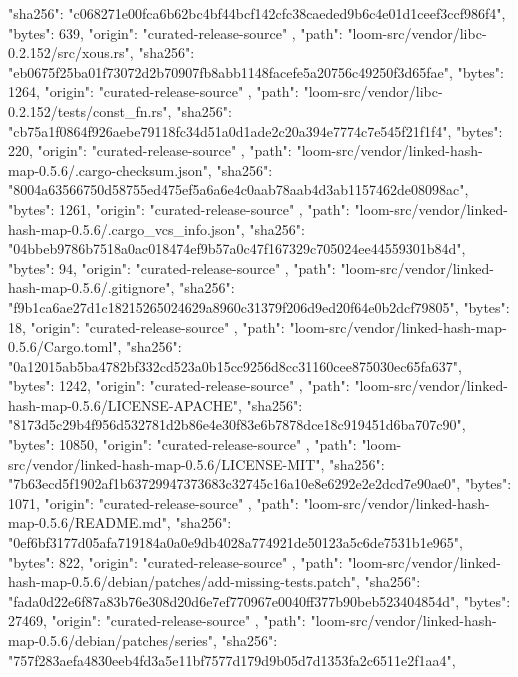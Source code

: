 {{      "sha256": "c068271e00fca6b62bc4bf44bcf142cfc38caeded9b6c4e01d1ceef3ccf986f4",
      "bytes": 639,
      "origin": "curated-release-source"
    },
    {
      "path": "loom-src/vendor/libc-0.2.152/src/xous.rs",
      "sha256": "eb0675f25ba01f73072d2b70907fb8abb1148facefe5a20756c49250f3d65fae",
      "bytes": 1264,
      "origin": "curated-release-source"
    },
    {
      "path": "loom-src/vendor/libc-0.2.152/tests/const_fn.rs",
      "sha256": "cb75a1f0864f926aebe79118fc34d51a0d1ade2c20a394e7774c7e545f21f1f4",
      "bytes": 220,
      "origin": "curated-release-source"
    },
    {
      "path": "loom-src/vendor/linked-hash-map-0.5.6/.cargo-checksum.json",
      "sha256": "8004a63566750d58755ed475ef5a6a6e4c0aab78aab4d3ab1157462de08098ac",
      "bytes": 1261,
      "origin": "curated-release-source"
    },
    {
      "path": "loom-src/vendor/linked-hash-map-0.5.6/.cargo_vcs_info.json",
      "sha256": "04bbeb9786b7518a0ac018474ef9b57a0c47f167329c705024ee44559301b84d",
      "bytes": 94,
      "origin": "curated-release-source"
    },
    {
      "path": "loom-src/vendor/linked-hash-map-0.5.6/.gitignore",
      "sha256": "f9b1ca6ae27d1c18215265024629a8960c31379f206d9ed20f64e0b2dcf79805",
      "bytes": 18,
      "origin": "curated-release-source"
    },
    {
      "path": "loom-src/vendor/linked-hash-map-0.5.6/Cargo.toml",
      "sha256": "0a12015ab5ba4782bf332cd523a0b15cc9256d8cc31160cee875030ec65fa637",
      "bytes": 1242,
      "origin": "curated-release-source"
    },
    {
      "path": "loom-src/vendor/linked-hash-map-0.5.6/LICENSE-APACHE",
      "sha256": "8173d5c29b4f956d532781d2b86e4e30f83e6b7878dce18c919451d6ba707c90",
      "bytes": 10850,
      "origin": "curated-release-source"
    },
    {
      "path": "loom-src/vendor/linked-hash-map-0.5.6/LICENSE-MIT",
      "sha256": "7b63ecd5f1902af1b63729947373683c32745c16a10e8e6292e2e2dcd7e90ae0",
      "bytes": 1071,
      "origin": "curated-release-source"
    },
    {
      "path": "loom-src/vendor/linked-hash-map-0.5.6/README.md",
      "sha256": "0ef6bf3177d05afa719184a0a0e9db4028a774921de50123a5c6de7531b1e965",
      "bytes": 822,
      "origin": "curated-release-source"
    },
    {
      "path": "loom-src/vendor/linked-hash-map-0.5.6/debian/patches/add-missing-tests.patch",
      "sha256": "fada0d22e6f87a83b76e308d20d6e7ef770967e0040ff377b90beb523404854d",
      "bytes": 27469,
      "origin": "curated-release-source"
    },
    {
      "path": "loom-src/vendor/linked-hash-map-0.5.6/debian/patches/series",
      "sha256": "757f283aefa4830eeb4fd3a5e11bf7577d179d9b05d7d1353fa2c6511e2f1aa4",
}}
